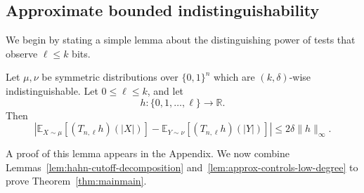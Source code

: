 \documentclass[manuscript,nonacm]{acmart}
\begin{document}
\subsection{Approximate bounded indistinguishability}
We begin by stating a simple lemma about the distinguishing power of tests that observe $\ell\leq k$ bits. 

\begin{lemma}
\label{lem:approx-controls-low-degree}
Let \(\mu,\nu\) be symmetric distributions over \(\{0,1\}^n\) which are
\((k,\delta)\)-wise indistinguishable. Let \(0\le \ell\le k\), and let
\[
    h:\{0,1,\dots,\ell\}\to\mathbb R.
\]
Then
\[
    \left|
        \mathbb E_{X\sim\mu}[(T_{n,\ell}h)(|X|)]
        -
        \mathbb E_{Y\sim\nu}[(T_{n,\ell}h)(|Y|)]
    \right|
    \le
    2\delta\|h\|_\infty.
\]
\end{lemma}
A proof of this lemma appears in the Appendix.
We now combine Lemmas~\ref{lem:hahn-cutoff-decomposition} and~\ref{lem:approx-controls-low-degree} to prove Theorem~\ref{thm:mainmain}.
\end{document}
